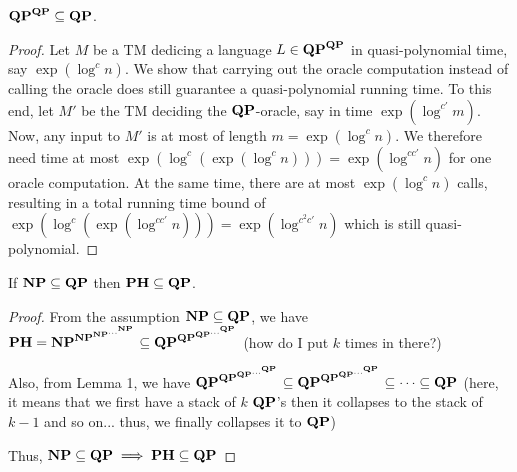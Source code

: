 \documentclass[12pt]{article}
\theoremstyle{definition}
\begin{document}
\newpage

\begin{lemma}
	\label{lem:qp-collapse}
	$\mathbf{QP}^{\mathbf{QP}} \subseteq \mathbf{QP}$.
\end{lemma}

\begin{proof}
  Let $M$ be a TM dedicing a language $L \in \mathbf{QP}^{\mathbf{QP}}$ in
  quasi-polynomial time, say $\exp(\log^c n)$.
  We show that carrying out the oracle computation instead of calling the
  oracle does still guarantee a quasi-polynomial running time. To this end,
  let $M'$ be the TM deciding the $\mathbf{QP}$-oracle, say in time
  $\exp(\log^{c'} m)$.
  Now, any input to $M'$ is at most of length $m = \exp(\log^c n)$. We
  therefore need time at most
  $\exp(\log^c (\exp(\log^c n))) = \exp(\log^{cc'} n)$
  for one oracle computation. At the same time, there are at most
  $\exp(\log^c n)$ calls, resulting in a total running time bound of
  $\exp(\log^c (\exp(\log^{cc'} n))) = \exp(\log^{c^2 c'} n)$
  which is still quasi-polynomial.
\end{proof}

%   
%   
%   
%   
%   
%   

\begin{lemma}
  \label{lem:ph-sub-qp}
  If $\mathbf{NP} \subseteq \mathbf{QP}$ then
  $\mathbf{PH} \subseteq \mathbf{QP}$.
\end{lemma}

\begin{proof}
	From the assumption $\mathbf{NP} \subseteq \mathbf{QP}$, we have $\mathbf{PH} = \mathbf{NP}^{\mathbf{NP}^{\mathbf{NP}^{\dots^{\mathbf{NP}}}}} \subseteq \mathbf{QP}^{\mathbf{QP}^{\mathbf{QP}^{\dots^{\mathbf{QP}}}}}$ (how do I put $k$ times in there?)
	
	Also, from Lemma 1, we have $\mathbf{QP}^{\mathbf{QP}^{\mathbf{QP}^{\dots^{\mathbf{QP}}}}} \subseteq \mathbf{QP}^{\mathbf{QP}^{\mathbf{QP}^{\dots^{\mathbf{QP}}}}} \subseteq \dots \subseteq \mathbf{QP}$ (here, it means that we first have a stack of $k$ $\mathbf{QP}$'s then it collapses to the stack of $k - 1$ and so on... thus, we finally collapses it to $\mathbf{QP}$)
	
	Thus, $\mathbf{NP} \subseteq \mathbf{QP} \implies \mathbf{PH} \subseteq \mathbf{QP}$
\end{proof}
\end{document}
